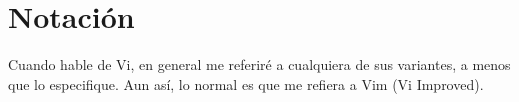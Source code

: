 \section{Notación}\label{sec:vim-notacion}
Cuando hable de Vi, en general me referiré a cualquiera de sus variantes, a menos que lo especifique. Aun así,
lo normal es que me refiera a Vim (Vi Improved).
